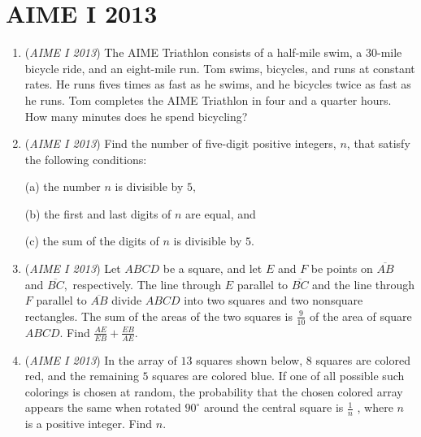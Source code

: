 \section{AIME I 2013}
        \begin{enumerate}
        	\item (\textit{AIME I 2013}) The AIME Triathlon consists of a half-mile swim, a 30-mile bicycle ride, and an eight-mile run. Tom swims, bicycles, and runs at constant rates. He runs fives times as fast as he swims, and he bicycles twice as fast as he runs. Tom completes the AIME Triathlon in four and a quarter hours. How many minutes does he spend bicycling?


 

	\item (\textit{AIME I 2013}) Find the number of five-digit positive integers, $n$, that satisfy the following conditions:


 
            \begin{itemize}
(a) the number $n$ is divisible by $5,$

            \end{itemize}
            
            \begin{itemize}
(b) the first and last digits of $n$ are equal, and

            \end{itemize}
            
            \begin{itemize}
(c) the sum of the digits of $n$ is divisible by $5.$

            \end{itemize}
            

	\item (\textit{AIME I 2013}) Let $ABCD$ be a square, and let $E$ and $F$ be points on $\overline{AB}$ and $\overline{BC},$ respectively. The line through $E$ parallel to $\overline{BC}$ and the line through $F$ parallel to $\overline{AB}$ divide $ABCD$ into two squares and two nonsquare rectangles. The sum of the areas of the two squares is $\frac{9}{10}$ of the area of square $ABCD.$ Find $\frac{AE}{EB} + \frac{EB}{AE}.$


	\item (\textit{AIME I 2013}) In the array of $13$ squares shown below, $8$ squares are colored red, and the remaining $5$ squares are colored blue. If one of all possible such colorings is chosen at random, the probability that the chosen colored array appears the same when rotated $90^{\circ}$ around the central square is $\frac{1}{n}$ , where $n$ is a positive integer. Find $n$.



\end{enumerate}
